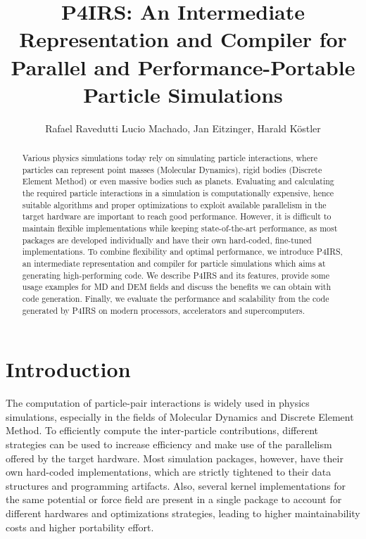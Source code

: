 \documentclass[Afour,sageh,times]{sagej}
\begin{document}

\title{P4IRS: An Intermediate Representation and Compiler for Parallel and Performance-Portable Particle Simulations}

\author{Rafael Ravedutti Lucio Machado, Jan Eitzinger, Harald Köstler}


\begin{abstract}
Various physics simulations today rely on simulating particle interactions, where particles can represent point masses (Molecular Dynamics), rigid bodies (Discrete Element Method) or even massive bodies such as planets.
Evaluating and calculating the required particle interactions in a simulation is computationally expensive, hence suitable algorithms and proper optimizations to exploit available parallelism in the target hardware are important to reach good performance.
However, it is difficult to maintain flexible implementations while keeping state-of-the-art performance, as most packages are developed individually and have their own hard-coded, fine-tuned implementations.
To combine flexibility and optimal performance, we introduce P4IRS, an intermediate representation and compiler for particle simulations which aims at generating high-performing code.
We describe P4IRS and its features, provide some usage examples for MD and DEM fields and discuss the benefits we can obtain with code generation.
Finally, we evaluate the performance and scalability from the code generated by P4IRS on modern processors, accelerators and supercomputers.
\end{abstract}


\maketitle

\section{Introduction}

The computation of particle-pair interactions is widely used in physics simulations, especially in the fields of Molecular Dynamics and Discrete Element Method.
To efficiently compute the inter-particle contributions, different strategies can be used to increase efficiency and make use of the parallelism offered by the target hardware.
Most simulation packages, however, have their own hard-coded implementations, which are strictly tightened to their data structures and programming artifacts.
Also, several kernel implementations for the same potential or force field are present in a single package to account for different hardwares and optimizations strategies, leading to higher maintainability costs and higher portability effort.
\end{document}
